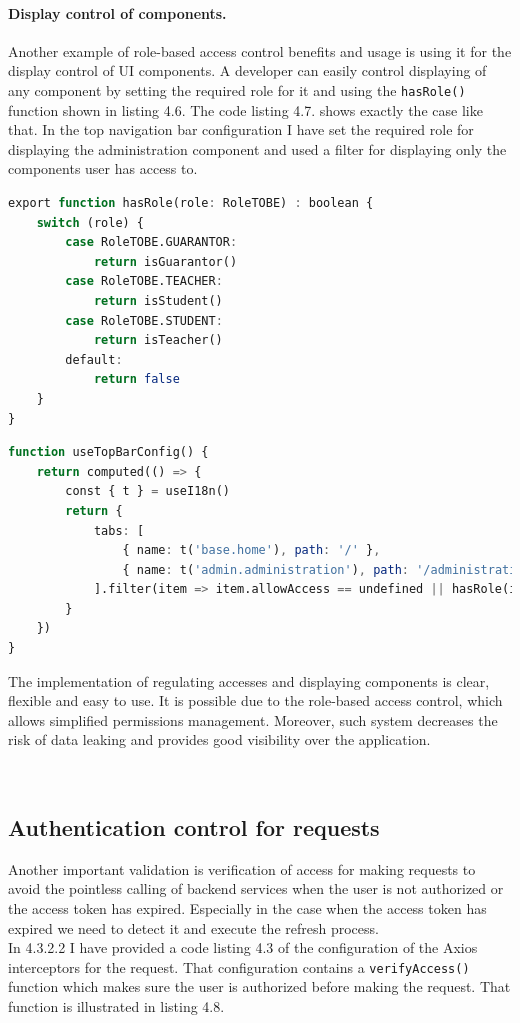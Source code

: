 \paragraph*{Display control of components.} Another example of role-based access control benefits and usage is using it for the display control of UI components. A developer can easily control displaying of any component by setting the required role for it and using the \texttt{hasRole()} function shown in listing 4.6. The code listing 4.7. shows exactly the case like that. In the top navigation bar configuration I have set the required role for displaying the administration component and used a filter for displaying only the components user has access to.

\begin{lstlisting}[language=Octave, caption=Role validation]
export function hasRole(role: RoleTOBE) : boolean {
    switch (role) {
        case RoleTOBE.GUARANTOR:
            return isGuarantor()
        case RoleTOBE.TEACHER:
            return isStudent()
        case RoleTOBE.STUDENT:
            return isTeacher()
        default:
            return false
    }
}
\end{lstlisting}


\begin{lstlisting}[language=Octave, caption=Filtering displayed components by role]
function useTopBarConfig() {
    return computed(() => {
        const { t } = useI18n()
        return {
            tabs: [
                { name: t('base.home'), path: '/' },
                { name: t('admin.administration'), path: '/administration' , allowAccess: Role.GUARANTOR },
            ].filter(item => item.allowAccess == undefined || hasRole(item.allowAccess))
        }
    })
}
\end{lstlisting}



\noindent The implementation of regulating accesses and displaying components is clear, flexible and easy to use. It is possible due to the role-based access control, which allows simplified permissions management. Moreover, such system decreases the risk of data leaking and provides good visibility over the application.


\

\subsection{Authentication control for requests} Another important validation is verification of access for making requests to avoid the pointless calling of backend services when the user is not authorized or the access token has expired. Especially in the case when the access token has expired we need to detect it and execute the refresh process.\\
In 4.3.2.2 I have provided a code listing 4.3 of the configuration of the Axios interceptors for the request. That configuration contains a \texttt{verifyAccess()} function which makes sure the user is authorized before making the request. That function is illustrated in listing 4.8.\\


